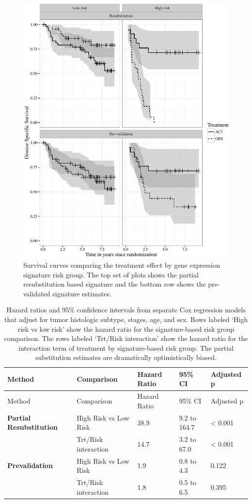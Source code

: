 \documentclass[12pt,]{article}
\begin{document}
\begin{figure}[htbp]
\centering
\includegraphics{paper_files/figure-latex/inter1-1.pdf}
\caption{Survival curves comparing the treatment effect by gene
expression signature risk group. The top set of plots shows the partial
resubstitution based signature and the bottom row shows the
pre-validated signature estimates. \label{fig3}}
\end{figure}

\begin{longtable}[c]{@{}lllll@{}}
\caption{Hazard ratios and 95\% confidence intervals from separate Cox
regression models that adjust for tumor histologic subtype, stages, age,
and sex. Rows labeled `High risk vs low risk' show the hazard ratio for
the signature-based risk group comparison. The rows labeled `Trt/Risk
interaction' show the hazard ratio for the interaction term of treatment
by signature-based risk group. The partial substitution estimates are
dramatically optimistically biased. \label{adjhr}}\tabularnewline
\toprule
Method & Comparison & Hazard Ratio & 95\% CI & Adjusted p\tabularnewline
\midrule
\endfirsthead
\toprule
Method & Comparison & Hazard Ratio & 95\% CI & Adjusted p\tabularnewline
\midrule
\endhead
\textbf{Partial Resubstitution} & High Risk vs Low Risk & 38.9 & 9.2 to
164.7 & \textless{} 0.001\tabularnewline
& Trt/Risk interaction & 14.7 & 3.2 to 67.0 & \textless{}
0.001\tabularnewline
\textbf{Prevalidation} & High Risk vs Low Risk & 1.9 & 0.8 to 4.3 &
0.122\tabularnewline
& Trt/Risk interaction & 1.8 & 0.5 to 6.5 & 0.395\tabularnewline
\bottomrule
\end{longtable}
\end{document}
